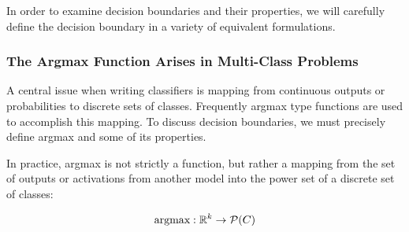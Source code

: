 In order to examine decision boundaries and their properties, we will carefully define the decision boundary in a variety of equivalent formulations. 

\subsubsection{The Argmax Function Arises in Multi-Class Problems}

A central issue when writing classifiers is mapping from continuous outputs or probabilities to discrete sets of classes. Frequently argmax type functions are used to accomplish this mapping. To discuss decision boundaries, we must precisely define argmax and some of its properties. 

In practice, argmax is not strictly a function, but rather a mapping from the set of outputs or activations from another model into the power set of a discrete set of classes:

\begin{equation}
    \text{argmax} : \mathbb{R}^k \to \mathcal{P}(C)
\end{equation}

